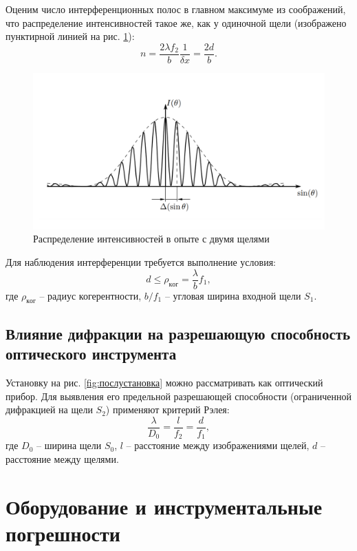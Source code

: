 \documentclass[a4paper]{article}
\newcommand{\picref}[1]{рис. \ref{#1}}
\begin{document}
Оценим число интерференционных полос в главном максимуме из соображений, что распределение интенсивностей такое же, как у одиночной щели (изображено пунктирной линией на \picref{fig:Фраунгофер3}):
\begin{equation}\label{eq:числоЛиний}
	n = \frac{2 \lambda f_2}{b} \frac{1}{\delta x} = \frac{2 d}{b}.
\end{equation}

\begin{figure}[tbp]
	\centering
	\includegraphics[width=0.8\linewidth]{Screenshot_5}
	\caption{Распределение интенсивностей в опыте с двумя щелями}
	\label{fig:Фраунгофер3}
\end{figure}


Для наблюдения интерференции требуется выполнение условия:
\begin{equation*}\label{eq:условиесрадиусом}
	d\le \rho_{ког} = \frac{\lambda}{b} f_1,
\end{equation*}
где $ \rho_{ког} $ -- радиус когерентности, $ b / f_1 $ -- угловая ширина входной щели $ S_1 $.

\subsection{Влияние дифракции на разрешающую способность оптического инструмента}

Установку на рис. \ref{fig:послустановка} можно рассматривать как оптический прибор. Для выявления его предельной разрешающей способности (ограниченной дифракцией на щели $ S_2 $) применяют критерий Рэлея:
\begin{equation}\label{eq:рэлей}
	\frac{\lambda}{D_0} = \frac{l}{f_2} = \frac{d}{f_1},
\end{equation}
где $ D_0 $ -- ширина щели $ S_0 $, $ l $ -- расстояние между изображениями щелей, $ d $ -- расстояние между щелями.

\section{Оборудование и инструментальные погрешности}
\end{document}
